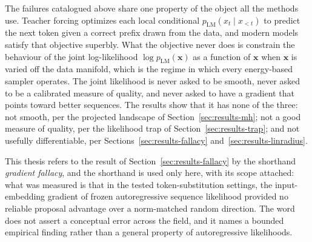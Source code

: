 The failures catalogued above share one property of the object all the methods use. Teacher forcing optimizes each local conditional $p_{\text{LM}}(x_t \mid x_{<t})$ to predict the next token given a correct prefix drawn from the data, and modern models satisfy that objective superbly. What the objective never does is constrain the behaviour of the joint log-likelihood $\log p_{\text{LM}}(\bm{x})$ as a function of $\bm{x}$ when $\bm{x}$ is varied off the data manifold, which is the regime in which every energy-based sampler operates. The joint likelihood is never asked to be smooth, never asked to be a calibrated measure of quality, and never asked to have a gradient that points toward better sequences. The results show that it has none of the three: not smooth, per the projected landscape of Section~\ref{sec:results-mh}; not a good measure of quality, per the likelihood trap of Section~\ref{sec:results-trap}; and not usefully differentiable, per Sections~\ref{sec:results-fallacy} and~\ref{sec:results-linradius}.

This thesis refers to the result of Section~\ref{sec:results-fallacy} by the shorthand \emph{gradient fallacy}, and the shorthand is used only here, with its scope attached: what was measured is that in the tested token-substitution settings, the input-embedding gradient of frozen autoregressive sequence likelihood provided no reliable proposal advantage over a norm-matched random direction. The word does not assert a conceptual error across the field, and it names a bounded empirical finding rather than a general property of autoregressive likelihoods.

